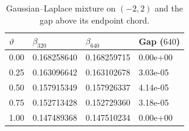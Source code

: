 \begin{table}[htbp]
\centering
\caption{Gaussian--Laplace mixture on $(-2,2)$ and the gap above its endpoint chord.}
\label{tab:mixtures}
\begin{tabular}{llll}
\toprule
$\vartheta$ & $\beta_{320}$ & $\beta_{640}$ & Gap ($640$) \\
\midrule
0.00 & 0.168258640 & 0.168259715 & 0.00e+00 \\
0.25 & 0.163096642 & 0.163102678 & 3.03e-05 \\
0.50 & 0.157915349 & 0.157926337 & 4.14e-05 \\
0.75 & 0.152713428 & 0.152729360 & 3.18e-05 \\
1.00 & 0.147489368 & 0.147510234 & 0.00e+00 \\
\bottomrule
\end{tabular}
\end{table}
